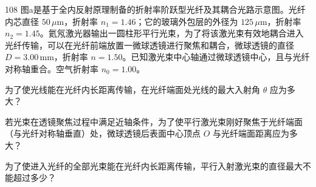 \begin{problem}[2019年第36届全国中学生物理竞赛复赛][光纤耦合与微球透镜]{108}
图a是基于全内反射原理制备的折射率阶跃型光纤及其耦合光路示意图。光纤内芯直径 $50\,\mu\mathrm{m}$，折射率 $n_{1}=1.46$；它的玻璃外包层的外径为 $125\,\mu\mathrm{m}$，折射率 $n_{2}=1.45$。氦氖激光器输出一圆柱形平行光束，为了将该激光束有效地耦合进入光纤传输，可以在光纤前端放置一微球透镜进行聚焦和耦合，微球透镜的直径 $D=3.00\,\mathrm{mm}$，折射率 $n=1.50$。已知激光束中心轴通过微球透镜中心，且与光纤对称轴重合。空气折射率 $n_{0}=1.00$。
\begin{subproblem}
为了使光线能在光纤内长距离传输，在光纤端面处光线的最大入射角 $\theta$ 应为多大？
\end{subproblem}
\begin{subproblem}
若光束在透镜聚焦过程中满足近轴条件，为了使平行激光束刚好聚焦于光纤端面（与光纤对称轴垂直）处，微球透镜后表面中心顶点 $O$ 与光纤端面距离应为多大？
\end{subproblem}
\begin{subproblem}
为了使进入光纤的全部光束能在光纤内长距离传输，平行入射激光束的直径最大不能超过多少？
\end{subproblem}
\end{problem}